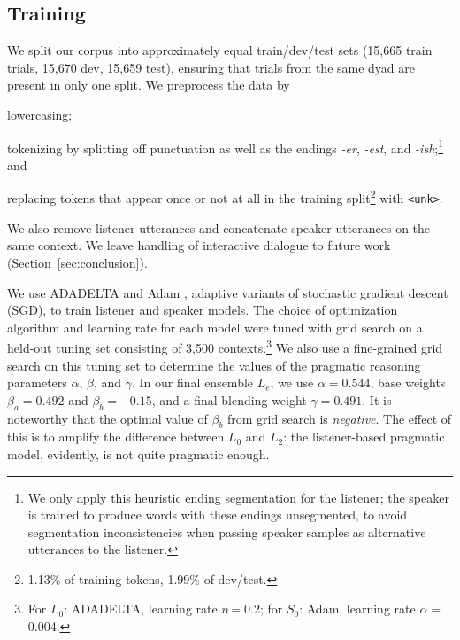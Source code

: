\documentclass[11pt,letterpaper]{article}
\newcommand{\word}{\textit}
\newcommand{\Listener}{L}
\newcommand{\Speaker}{S}
\renewcommand{\|}{\mid}
\newcommand{\secref}[1]{Section~\ref{#1}}
\newcommand{\todocheck}[1]{\textcolor{red}{#1}}
\begin{document}
\subsection{Training} \label{sec:training}

We split our corpus into approximately equal train/dev/test sets
(15,665 train trials, 15,670 dev, 15,659 test), ensuring that trials from
the same dyad are present in only one split.
We preprocess the data by
\begin{enumerate*}[label=\arabic*)]
\item lowercasing;
\item tokenizing by splitting off punctuation as well as the endings
\word{\mbox{-er}}, \word{\mbox{-est}}, and
\word{\mbox{-ish}};\footnote{We
only apply this heuristic ending segmentation for the listener; the speaker is trained to produce
words with these endings unsegmented, to avoid segmentation inconsistencies
when passing speaker samples as alternative utterances to the listener.} and
\item replacing tokens that appear once or not at all
in the training split\footnote{1.13\% of training tokens, 1.99\% of dev/test.} with \texttt{<unk>}.
\end{enumerate*}
We also remove
listener utterances and concatenate speaker utterances on the same context.
We leave handling of interactive dialogue to future work (\secref{sec:conclusion}).

We use ADADELTA
\cite{Zeiler2012} and Adam \cite{Kingma2014}, adaptive variants of
stochastic gradient descent (SGD), to train listener and speaker models.
The choice of optimization
algorithm and learning rate for each model were tuned with grid search
on a held-out tuning set consisting of 3,500 contexts.\footnote{For
  $\Listener_0$: ADADELTA, learning rate $\eta = {}$0.2; for
  $\Speaker_0$: Adam, learning rate $\alpha = {}$0.004.}
We also use a fine-grained grid search on this tuning set to determine the
values of the pragmatic reasoning parameters $\alpha$, $\beta$, and $\gamma$.
In our final ensemble $\Listener_e$, we use %
$\alpha = 0.544$, base weights $\beta_a = 0.492$ and $\beta_b = -0.15$, and
a final blending weight $\gamma = 0.491$.
It is noteworthy that the optimal value of $\beta_b$
from grid search is \emph{negative}. The effect of this is to amplify
the difference between $\Listener_0$ and $\Listener_2$: the listener-based
pragmatic model, evidently, is not quite pragmatic enough.
\end{document}
